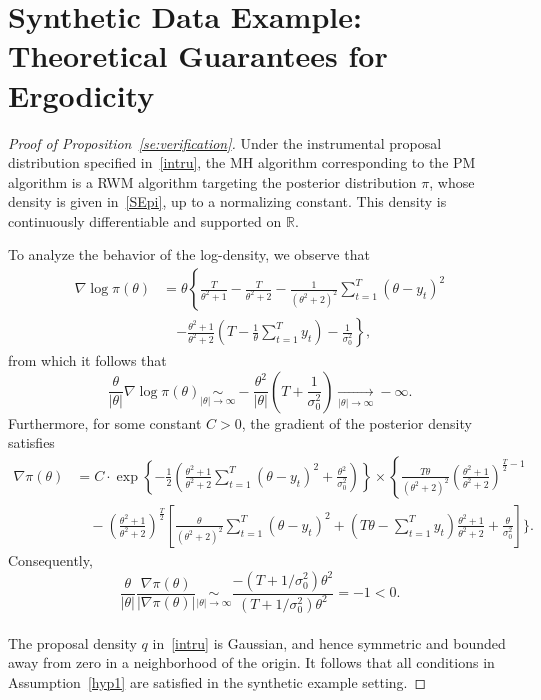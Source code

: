 \documentclass[pdflatex,sn-mathphys-num]{sn-jnl}
\theoremstyle{thmstyleone}
\theoremstyle{thmstyletwo}
\theoremstyle{thmstylethree}
\begin{document}
\section{Synthetic Data Example: Theoretical Guarantees for Ergodicity}
\label{appendixD0}
\begin{proof}[Proof of Proposition~\ref{se:verification}]
Under the instrumental proposal distribution specified in~\eqref{intru}, the MH algorithm corresponding to the PM algorithm is a RWM algorithm targeting the posterior distribution \( \pi \), whose density is given in~\eqref{SEpi}, up to a normalizing constant. This density is continuously differentiable and supported on \( \mathbb{R} \). 

\noindent
To analyze the behavior of the log-density, we observe that
\begin{align*}
\nabla \log \pi(\theta)
&= \theta \left\{ \frac{T}{\theta^2 + 1} - \frac{T}{\theta^2 + 2} 
- \frac{1}{(\theta^2 + 2)^2} \sum_{t=1}^T (\theta - y_t)^2 \right. \\
&\quad \left. - \frac{\theta^2 + 1}{\theta^2 + 2} \left( T - \frac{1}{\theta} \sum_{t=1}^T y_t \right) 
- \frac{1}{\sigma_0^2} \right\},
\end{align*}
from which it follows that
\[
\frac{\theta}{|\theta|} \nabla \log \pi(\theta) 
\underset{|\theta| \to \infty}{\sim} 
-\frac{\theta^2}{|\theta|} \left(T + \frac{1}{\sigma_0^2}\right) 
\xrightarrow[|\theta| \to \infty]{} -\infty.
\]
\noindent
Furthermore, for some constant \( C > 0 \), the gradient of the  posterior density satisfies
\begin{align*}
\nabla \pi(\theta)
&= C \cdot \exp\left\{-\frac{1}{2}\left( 
\frac{\theta^2+1}{\theta^2+2} \sum_{t=1}^{T}(\theta - y_t)^2 
+ \frac{\theta^2}{\sigma_0^2} \right)\right\} \times \left\{ \frac{T\theta}{(\theta^2 + 2)^2} 
\left(\frac{\theta^2 + 1}{\theta^2 + 2}\right)^{\frac{T}{2} - 1} \right. \\
&\quad - \left(\frac{\theta^2 + 1}{\theta^2 + 2}\right)^{\frac{T}{2}} 
\left[ \frac{\theta}{(\theta^2 + 2)^2} \sum_{t=1}^{T}(\theta - y_t)^2 
+ \left( T\theta - \sum_{t=1}^T y_t \right) \frac{\theta^2 + 1}{\theta^2 + 2} 
+ \frac{\theta}{\sigma_0^2} \right] \Bigg\}.
\end{align*}
Consequently,
\[\frac{\theta}{|\theta|} \frac{\nabla \pi(\theta)}{|\nabla \pi(\theta)|} 
\underset{|\theta| \to \infty}{\sim} 
\frac{-(T + 1/\sigma_0^2)\theta^2}{(T + 1/\sigma_0^2)\theta^2} = -1 < 0.\]\\

\noindent
The proposal density \( q \) in~\eqref{intru} is Gaussian, and hence symmetric and bounded away from zero in a neighborhood of the origin. It follows that all conditions in Assumption~\ref{hyp1} are satisfied in the synthetic example setting.


\end{proof}
\end{document}
